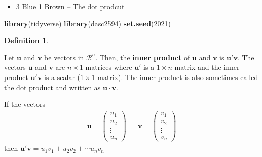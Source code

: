 \documentclass[
]{book}
\newenvironment{Shaded}{\begin{snugshade}}{\end{snugshade}}
\newcommand{\DecValTok}[1]{\textcolor[rgb]{0.00,0.00,0.81}{#1}}
\newcommand{\KeywordTok}[1]{\textcolor[rgb]{0.13,0.29,0.53}{\textbf{#1}}}
\newcommand{\NormalTok}[1]{#1}
\providecommand{\tightlist}{%
  \setlength{\itemsep}{0pt}\setlength{\parskip}{0pt}}
\theoremstyle{definition}
\newtheorem{definition}{Definition}[chapter]
\theoremstyle{definition}
\theoremstyle{definition}
\theoremstyle{remark}
\begin{document}
\begin{itemize}
\tightlist
\item
  \href{https://www.3blue1brown.com/lessons/dot-products}{3 Blue 1 Brown -- The dot prodcut}
\end{itemize}

\begin{Shaded}
\begin{Highlighting}[]
\KeywordTok{library}\NormalTok{(tidyverse)}
\KeywordTok{library}\NormalTok{(dasc2594)}
\KeywordTok{set.seed}\NormalTok{(}\DecValTok{2021}\NormalTok{)}
\end{Highlighting}
\end{Shaded}

\begin{definition}
\protect\hypertarget{def:unlabeled-div-184}{}\label{def:unlabeled-div-184}

Let \(\mathbf{u}\) and \(\mathbf{v}\) be vectors in \(\mathcal{R}^n\). Then, the \textbf{inner product} of \(\mathbf{u}\) and \(\mathbf{v}\) is \(\mathbf{u}' \mathbf{v}\). The vectors \(\mathbf{u}\) and \(\mathbf{v}\) are \(n \times 1\) matrices where \(\mathbf{u}'\) is a \(1 \times n\) matrix and the inner product \(\mathbf{u}' \mathbf{v}\) is a scalar (\(1 \times 1\) matrix). The inner product is also sometimes called the dot product and written as \(\mathbf{u} \cdot \mathbf{v}\).

If the vectors
\[
\begin{aligned}
\mathbf{u} = \begin{pmatrix} u_1 \\ u_2 \\ \vdots \\ u_n \end{pmatrix} & & \mathbf{v} = \begin{pmatrix} v_1 \\ v_2 \\ \vdots \\ v_n \end{pmatrix} 
\end{aligned}
\]
then \(\mathbf{u}' \mathbf{v} = u_1 v_1 + u_2 v_2 + \cdots u_n v_n\)

\end{definition}
\end{document}

